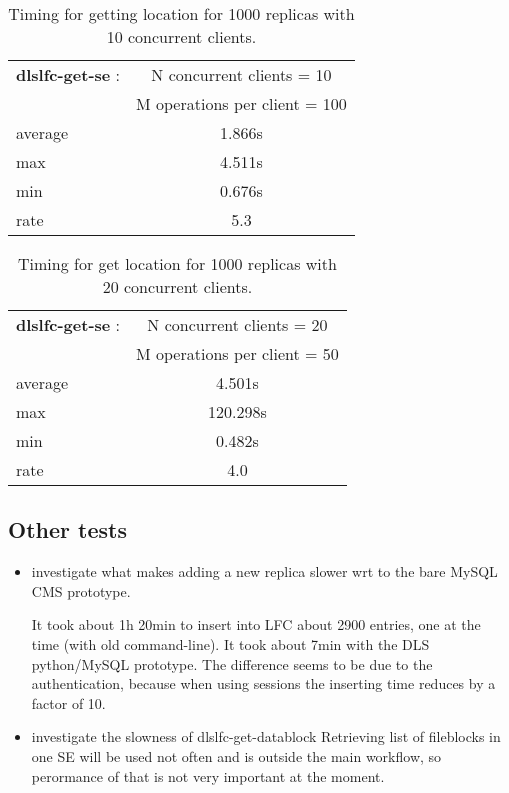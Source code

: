 \documentclass[pdftex]{cmspaper}
\begin{document}
\begin{table}[!htbp]
\begin{center}
 \begin{tabular}{|l|c|}         \hline
   {\bf dlslfc-get-se} : & N concurrent clients = 10  \\
   & M operations per client = 100\\ \hline
    average & 1.866s \\ \hline
    max & 4.511s \\ \hline
    min & 0.676s  \\ \hline
    rate  & 5.3 \\ \hline
\end{tabular}
\caption {Timing for getting location for 1000 replicas with 10 concurrent clients.}\label{dlslfc-get-se}
\end{center}
\end{table}

\begin{table}[!htbp]
\begin{center}
 \begin{tabular}{|l|c|}         \hline
   {\bf dlslfc-get-se} : & N concurrent clients = 20  \\ 
 & M operations per client = 50\\ \hline
    average & 4.501s \\ \hline
    max & 120.298s \\ \hline
    min &  0.482s  \\ \hline
    rate  & 4.0 \\ \hline
\end{tabular}
\caption {Timing for get location for 1000 replicas with 20 concurrent clients.}\label{dlslfc-get-se}
\end{center}
\end{table}
\subsection {Other tests}

\begin{itemize}

 \item investigate what makes adding a new replica slower wrt to the bare MySQL CMS prototype. 
      
       It took about 1h 20min to insert into LFC about 2900 entries, one at the time (with old command-line).
       It took about 7min with the DLS python/MySQL prototype.
       The difference seems to be due to the authentication, because when using sessions the 
       inserting time reduces by a factor of 10. 

 \item investigate the slowness of dlslfc-get-datablock 
       Retrieving list of fileblocks in one SE will be used not often and is outside the main workflow, so perormance of that is not very important at the moment.
       
                                                                                                  
  \end{itemize} 
\end{document}

